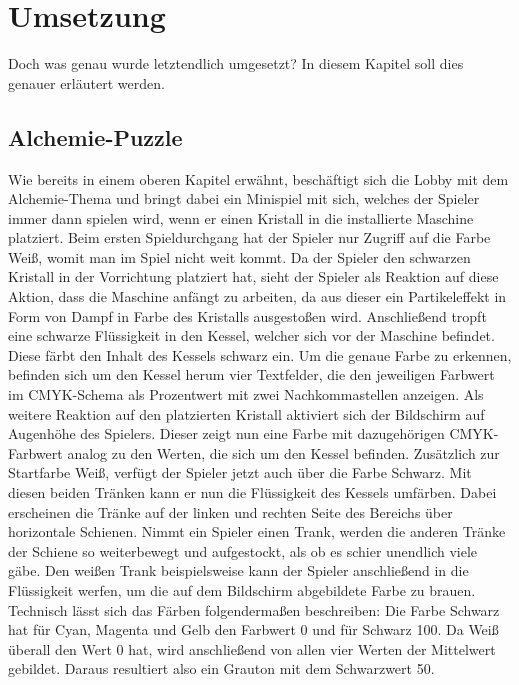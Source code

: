 \chapter{Umsetzung}
Doch was genau wurde letztendlich umgesetzt? In diesem Kapitel soll dies genauer erläutert werden.
\section{Alchemie-Puzzle}
Wie bereits in einem oberen Kapitel erwähnt, beschäftigt sich die Lobby mit dem Alchemie-Thema und bringt dabei ein Minispiel mit sich, welches der Spieler immer dann spielen wird, wenn er einen Kristall in die installierte Maschine platziert. Beim ersten Spieldurchgang hat der Spieler nur Zugriff auf die Farbe Weiß, womit man im Spiel nicht weit kommt. Da der Spieler den schwarzen Kristall in der Vorrichtung platziert hat, sieht der Spieler als Reaktion auf diese Aktion, dass die Maschine anfängt zu arbeiten, da aus dieser ein Partikeleffekt in Form von Dampf in Farbe des Kristalls ausgestoßen wird. Anschließend tropft eine schwarze Flüssigkeit in den Kessel, welcher sich vor der Maschine befindet. Diese färbt den Inhalt des Kessels schwarz ein. Um die genaue Farbe zu erkennen, befinden sich um den Kessel herum vier Textfelder, die den jeweiligen Farbwert im CMYK-Schema als Prozentwert mit zwei Nachkommastellen anzeigen. Als weitere Reaktion auf den platzierten Kristall aktiviert sich der Bildschirm auf Augenhöhe des Spielers. Dieser zeigt nun eine Farbe mit dazugehörigen CMYK-Farbwert analog zu den Werten, die sich um den Kessel befinden. Zusätzlich zur Startfarbe Weiß, verfügt der Spieler jetzt auch über die Farbe Schwarz. Mit diesen beiden Tränken kann er nun die Flüssigkeit des Kessels umfärben. Dabei erscheinen die Tränke auf der linken und rechten Seite des Bereichs über horizontale Schienen. Nimmt ein Spieler einen Trank, werden die anderen Tränke der Schiene so weiterbewegt und aufgestockt, als ob es schier unendlich viele gäbe. Den weißen Trank beispielsweise kann der Spieler anschließend in die Flüssigkeit werfen, um die auf dem Bildschirm abgebildete Farbe zu brauen. Technisch lässt sich das Färben folgendermaßen beschreiben: Die Farbe Schwarz hat für Cyan, Magenta und Gelb den Farbwert 0 und für Schwarz 100. Da Weiß überall den Wert 0 hat, wird anschließend von allen vier Werten der Mittelwert gebildet. Daraus resultiert also ein Grauton mit dem Schwarzwert 50.
